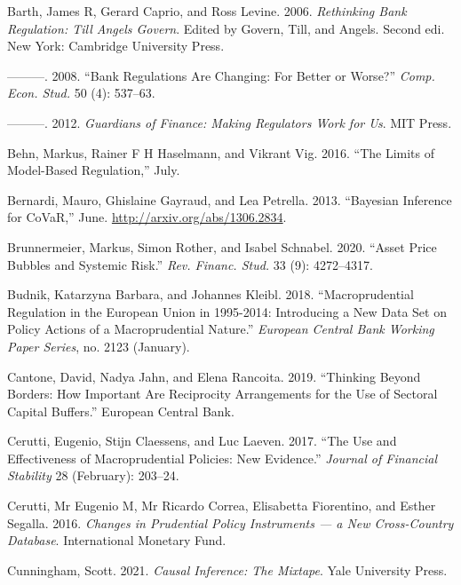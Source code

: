 \documentclass[
  10pt,
]{article}
\begin{document}
\leavevmode\hypertarget{ref-Barth2006}{}%
Barth, James R, Gerard Caprio, and Ross Levine. 2006. \emph{Rethinking
Bank Regulation: Till Angels Govern}. Edited by Govern, Till, and
Angels. Second edi. New York: Cambridge University Press.

\leavevmode\hypertarget{ref-Barth2008}{}%
---------. 2008. ``Bank Regulations Are Changing: For Better or Worse?''
\emph{Comp. Econ. Stud.} 50 (4): 537--63.

\leavevmode\hypertarget{ref-Barth2012}{}%
---------. 2012. \emph{Guardians of Finance: Making Regulators Work for
Us}. MIT Press.

\leavevmode\hypertarget{ref-Behn2016}{}%
Behn, Markus, Rainer F H Haselmann, and Vikrant Vig. 2016. ``The Limits
of Model-Based Regulation,'' July.

\leavevmode\hypertarget{ref-Bernardi2013}{}%
Bernardi, Mauro, Ghislaine Gayraud, and Lea Petrella. 2013. ``Bayesian
Inference for CoVaR,'' June. \url{http://arxiv.org/abs/1306.2834}.

\leavevmode\hypertarget{ref-Brunnermeier2020}{}%
Brunnermeier, Markus, Simon Rother, and Isabel Schnabel. 2020. ``Asset
Price Bubbles and Systemic Risk.'' \emph{Rev. Financ. Stud.} 33 (9):
4272--4317.

\leavevmode\hypertarget{ref-Budnik2018}{}%
Budnik, Katarzyna Barbara, and Johannes Kleibl. 2018. ``Macroprudential
Regulation in the European Union in 1995-2014: Introducing a New Data
Set on Policy Actions of a Macroprudential Nature.'' \emph{European
Central Bank Working Paper Series}, no. 2123 (January).

\leavevmode\hypertarget{ref-Cantone2019}{}%
Cantone, David, Nadya Jahn, and Elena Rancoita. 2019. ``Thinking Beyond
Borders: How Important Are Reciprocity Arrangements for the Use of
Sectoral Capital Buffers.'' European Central Bank.

\leavevmode\hypertarget{ref-Cerutti2017}{}%
Cerutti, Eugenio, Stijn Claessens, and Luc Laeven. 2017. ``The Use and
Effectiveness of Macroprudential Policies: New Evidence.'' \emph{Journal
of Financial Stability} 28 (February): 203--24.

\leavevmode\hypertarget{ref-Cerutti2016}{}%
Cerutti, Mr Eugenio M, Mr Ricardo Correa, Elisabetta Fiorentino, and
Esther Segalla. 2016. \emph{Changes in Prudential Policy Instruments ---
a New Cross-Country Database}. International Monetary Fund.

\leavevmode\hypertarget{ref-Cunningham2021}{}%
Cunningham, Scott. 2021. \emph{Causal Inference: The Mixtape}. Yale
University Press.
\end{document}
